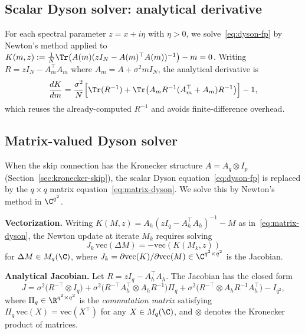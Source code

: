\subsection{Scalar Dyson solver: analytical derivative}\label{app:scalar-jacobian}

For each spectral parameter $z = x + i\eta$ with $\eta > 0$, we solve~\eqref{eq:dyson-fp} by Newton's method applied to $K(m, z) := \frac{1}{N}\Tr\bigl(A(m)(zI_N - A(m)^\top A(m))^{-1}\bigr) - m = 0$. Writing $R = zI_N - A_m^\top A_m$ where $A_m = A + \sigma^2 m I_N$, the analytical derivative is
\begin{equation}\label{eq:scalar-analytical-jacobian-app}
\frac{dK}{dm} = \frac{\sigma^2}{N}\Bigl[\Tr(R^{-1}) + \Tr\bigl(A_m R^{-1}(A_m^\top + A_m) R^{-1}\bigr)\Bigr] - 1,
\end{equation}
which reuses the already-computed $R^{-1}$ and avoids finite-difference overhead.

\subsection{Matrix-valued Dyson solver}\label{app:matrix-dyson-details}

When the skip connection has the Kronecker structure $A = A_q \otimes I_p$ (Section~\ref{sec:kronecker-skip}), the scalar Dyson equation~\eqref{eq:dyson-fp} is replaced by the $q \times q$ matrix equation~\eqref{eq:matrix-dyson}. We solve this by Newton's method in $\C^{q^2}$.

\medskip
\noindent\textbf{Vectorization.}
Writing $K(M, z) = A_h(zI_q - A_h^\top A_h)^{-1} - M$ as in~\eqref{eq:matrix-dyson}, the Newton update at iterate $M_k$ requires solving
\begin{equation}\label{eq:newton-matrix-dyson-app}
J_k \, \mathrm{vec}(\Delta M) = -\mathrm{vec}(K(M_k, z))
\end{equation}
for $\Delta M \in M_q(\C)$, where $J_k = \partial \mathrm{vec}(K) / \partial \mathrm{vec}(M) \in \C^{q^2 \times q^2}$ is the Jacobian.

\medskip
\noindent\textbf{Analytical Jacobian.}
Let $R = zI_q - A_h^\top A_h$. The Jacobian has the closed form
\begin{equation}\label{eq:analytical-jacobian-app}
J = \sigma^2\bigl(R^{-\top} \otimes I_q\bigr) + \sigma^2\bigl(R^{-\top}A_h^\top \otimes A_h R^{-1}\bigr)\Pi_q + \sigma^2\bigl(R^{-\top} \otimes A_h R^{-1} A_h^\top\bigr) - I_{q^2},
\end{equation}
where $\Pi_q \in \R^{q^2 \times q^2}$ is the \emph{commutation matrix} satisfying $\Pi_q \, \mathrm{vec}(X) = \mathrm{vec}(X^\top)$ for any $X \in M_q(\C)$, and $\otimes$ denotes the Kronecker product of matrices.

